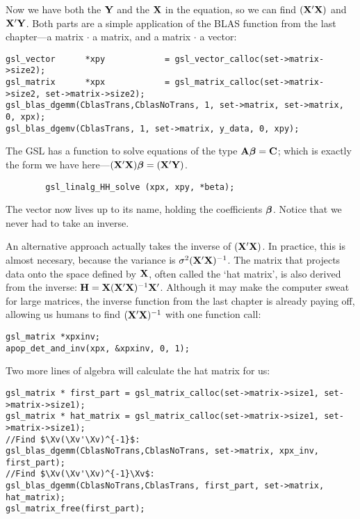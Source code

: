 Now we have both the ${\bf Y}$ and the ${\bf X}$ in the equation, so we can find $({\bf X}'{\bf X})$ and ${\bf X}'{\bf Y}$.
Both parts are a
simple application of the BLAS function from the last chapter---a matrix $\cdot$ a matrix, and a matrix $\cdot$ a vector:
\begin{lstlisting}
gsl_vector      *xpy            = gsl_vector_calloc(set->matrix->size2);
gsl_matrix      *xpx            = gsl_matrix_calloc(set->matrix->size2, set->matrix->size2);
gsl_blas_dgemm(CblasTrans,CblasNoTrans, 1, set->matrix, set->matrix, 0, xpx);
gsl_blas_dgemv(CblasTrans, 1, set->matrix, y_data, 0, xpy);
\end{lstlisting}

The GSL has a function to solve equations of the type ${\bf A} {\mbox{\boldmath$\beta$}} =
{\bf C}$; which is exactly the form we have here---$({\bf X}'{\bf X}){\mbox{\boldmath$\beta$}} = ({\bf X}'{\bf Y})$.  \label{ols}
\begin{lstlisting}
        gsl_linalg_HH_solve (xpx, xpy, *beta);
\end{lstlisting}

The vector  now lives up to its name, holding the coefficients
${\mbox{\boldmath$\beta$}}$. Notice that we never had to take an inverse.  

An alternative approach actually takes the inverse of $({\bf X}'{\bf X})$. In practice, this is
almost necesary, because the variance is $\sigma^2 ({\bf X}'{\bf X})^{-1}$.
The matrix that projects data onto the space defined by ${\bf X}$,
often called the `hat matrix', is also derived from the inverse: ${\bf H} = {\bf X}({\bf X}'{\bf X})^{-1}{\bf X}'$. Although it may
make the computer sweat for large matrices, the inverse function
from the last chapter is already paying off, allowing us humans to find
$({\bf X}'{\bf X})^{-1}$ with one function call:
\begin{lstlisting}
gsl_matrix *xpxinv;
apop_det_and_inv(xpx, &xpxinv, 0, 1);
\end{lstlisting}
Two more lines of algebra will calculate the hat matrix for us: 
\lstset{texcl=true}
\begin{lstlisting}
gsl_matrix * first_part = gsl_matrix_calloc(set->matrix->size1, set->matrix->size1);
gsl_matrix * hat_matrix = gsl_matrix_calloc(set->matrix->size1, set->matrix->size1);
//Find $\Xv(\Xv'\Xv)^{-1}$:
gsl_blas_dgemm(CblasNoTrans,CblasNoTrans, set->matrix, xpx_inv, first_part);	
//Find $\Xv(\Xv'\Xv)^{-1}\Xv$:
gsl_blas_dgemm(CblasNoTrans,CblasTrans, first_part, set->matrix, hat_matrix);	
gsl_matrix_free(first_part);
\end{lstlisting}
\lstset{texcl=false} %

